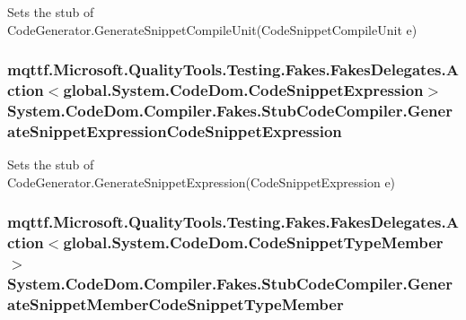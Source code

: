 Sets the stub of Code\-Generator.\-Generate\-Snippet\-Compile\-Unit(\-Code\-Snippet\-Compile\-Unit e)

\hypertarget{class_system_1_1_code_dom_1_1_compiler_1_1_fakes_1_1_stub_code_compiler_abb6f82d50785cbc8034c6709ece150a7}{
\subsubsection[{Generate\-Snippet\-Expression\-Code\-Snippet\-Expression}]{\setlength{\rightskip}{0pt plus 5cm}mqttf.\-Microsoft.\-Quality\-Tools.\-Testing.\-Fakes.\-Fakes\-Delegates.\-Action$<$global.\-System.\-Code\-Dom.\-Code\-Snippet\-Expression$>$ System.\-Code\-Dom.\-Compiler.\-Fakes.\-Stub\-Code\-Compiler.\-Generate\-Snippet\-Expression\-Code\-Snippet\-Expression}}\label{class_system_1_1_code_dom_1_1_compiler_1_1_fakes_1_1_stub_code_compiler_abb6f82d50785cbc8034c6709ece150a7}


Sets the stub of Code\-Generator.\-Generate\-Snippet\-Expression(\-Code\-Snippet\-Expression e)

\hypertarget{class_system_1_1_code_dom_1_1_compiler_1_1_fakes_1_1_stub_code_compiler_ae77212597b5ac56ca1a65abc0ab23741}{
\subsubsection[{Generate\-Snippet\-Member\-Code\-Snippet\-Type\-Member}]{\setlength{\rightskip}{0pt plus 5cm}mqttf.\-Microsoft.\-Quality\-Tools.\-Testing.\-Fakes.\-Fakes\-Delegates.\-Action$<$global.\-System.\-Code\-Dom.\-Code\-Snippet\-Type\-Member$>$ System.\-Code\-Dom.\-Compiler.\-Fakes.\-Stub\-Code\-Compiler.\-Generate\-Snippet\-Member\-Code\-Snippet\-Type\-Member}}\label{class_system_1_1_code_dom_1_1_compiler_1_1_fakes_1_1_stub_code_compiler_ae77212597b5ac56ca1a65abc0ab23741}


